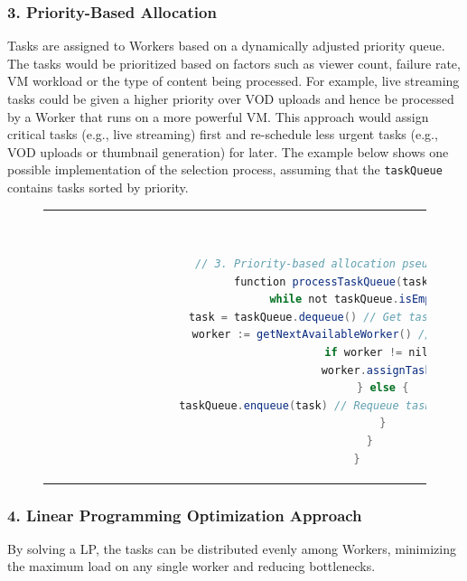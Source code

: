 \subsubsection{3. Priority-Based Allocation}
    Tasks are assigned to Workers based on a dynamically adjusted priority queue. The tasks would be prioritized based on factors such as viewer count, failure rate, \ac{VM} workload or the type of content being processed. For example, live streaming tasks could be given a higher priority over \ac{VOD} uploads and hence be processed by a Worker that runs on a more powerful \ac{VM}. This approach would assign critical tasks (e.g., live streaming) first and re-schedule less urgent tasks (e.g., \ac{VOD} uploads or thumbnail generation) for later. The example below shows one possible implementation of the selection process, assuming that the \texttt{taskQueue} contains tasks sorted by priority. 

    \begin{figure}[htpb]
      \begin{tabular}{c}
      \ \small \begin{lstlisting}[language=Java]
        // 3. Priority-based allocation pseudocode
        function processTaskQueue(taskQueue) {
            while not taskQueue.isEmpty() {
                task = taskQueue.dequeue() // Get task with highest priority
                worker := getNextAvailableWorker() // Find available Worker
                if worker != nil {
                    worker.assignTask(task)
                } else {
                    taskQueue.enqueue(task) // Requeue task if no Workers are available
                }
            }
        }
        \end{lstlisting}
      \end{tabular}
      \label{fig:priority-based-allocation}
    \end{figure}

\subsubsection{4. Linear Programming Optimization Approach}

By solving a \ac{LP}, the tasks can be distributed evenly among Workers, minimizing the maximum load on any single worker and reducing bottlenecks.

